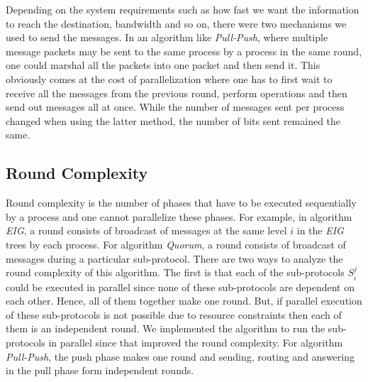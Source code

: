     Depending on the system requirements such as how fast we want the information to reach the destination, bandwidth and so on, there were two mechanisms we used to send the messages. In an algorithm like \textit{Pull-Push}, where multiple message packets may be sent to the same process by a process in the same round, one could marshal all the packets into one packet and then send it. This obviously comes at the cost of parallelization where one has to first wait to receive all the messages from the previous round, perform operations and then send out messages all at once. While the number of messages sent per process changed when using the latter method, the number of bits sent remained the same.


\subsection{Round Complexity}
Round complexity is the number of phases that have to be executed sequentially by a process and one cannot parallelize these phases. For example, in algorithm \textit{EIG}, a round consists of broadcast of messages at the same level $i$ in the \textit{EIG} trees by each process. For algorithm \textit{Quorum}, a round consists of broadcast of messages during a particular sub-protocol. There are two ways to analyze the round complexity of this algorithm. The first is that each of the sub-protocols $S_i^j$ could be executed in parallel since none of these sub-protocols are dependent on each other. Hence, all of them together make one round. But, if parallel execution of these sub-protocols is not possible due to resource constraints then each of them is an independent round. We implemented the algorithm to run the sub-protocols in parallel since that improved the round complexity. For algorithm \textit{Pull-Push}, the push phase makes one round and sending, routing and answering in the pull phase form independent rounds.

